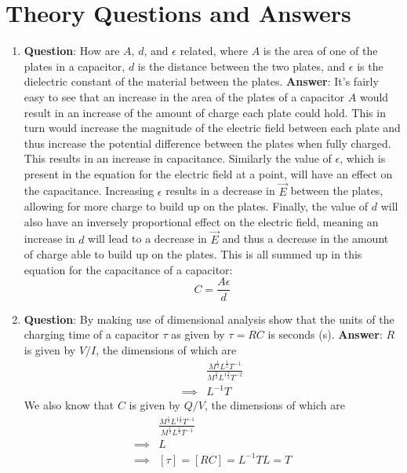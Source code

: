 \documentclass[12pt]{article}
\numberwithin{equation}{section}
\numberwithin{figure}{section}
\begin{document}
    \section{Theory Questions and Answers}
    \begin{enumerate}
        \item \textbf{Question}: How are $A$, $d$, and $\epsilon$ related, where $A$ is the area of one of the 
        plates in a capacitor, $d$ is the distance between the two plates, and $\epsilon$ is 
        the dielectric constant of the material between the plates. \newline
        \textbf{Answer}: It's fairly easy to see that an increase in the area of the plates of 
        a capacitor $A$ would result in an increase of the amount of charge each plate could hold. 
        This in turn would increase the magnitude of the electric field between each plate and thus 
        increase the potential difference between the plates when fully charged. This results in an 
        increase in capacitance. 
        Similarly the value of $\epsilon$, which is present in the equation for the electric field at 
        a point, will have an effect on the capacitance. Increasing $\epsilon$ results in a decrease 
        in $\vec{E}$ between the plates, allowing for more charge to build up on the plates. 
        Finally, the value of $d$ will also have an inversely proportional effect on the electric 
        field, meaning an increase in $d$ will lead to a decrease in $\vec{E}$ and thus a decrease in 
        the amount of charge able to build up on the plates. 
        This is all summed up in this equation for the capacitance of a capacitor:
        \begin{equation}
            C=\frac{A\epsilon}{d}
            \label{eqn:capacitance}
        \end{equation}
        

        \item \textbf{Question}: By making use of dimensional analysis show that the units of the 
        charging time of a capacitor $\tau$ as given by $\tau = RC$ is seconds (s). \newline
        \textbf{Answer}: $R$ is given by $V/I$, the dimensions of which are 
        \begin{align*}
            &\frac{M^{\frac{1}{2}}L^{\frac{1}{2}}T^{-1}}{M^{\frac{1}{2}}L^{1\frac{1}{2}}T^{-2}} \\
            \implies &L^{-1}T
        \end{align*}
        We also know that $C$ is given by $Q/V$, the dimensions of which are
        \begin{align*}
            &\frac{M^{\frac{1}{2}}L^{1\frac{1}{2}}T^{-1}}{M^{\frac{1}{2}}L^{\frac{1}{2}}T^{-1}} \\
            \implies &L \\
            \implies &[\tau]=[RC]=L^{-1}TL=T
        \end{align*}


\end{enumerate}
\end{document}
